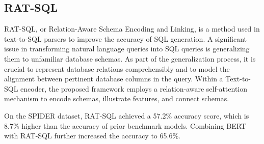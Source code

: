 \subsection{RAT-SQL} \label{sec:ratsql}

RAT-SQL, or Relation-Aware Schema Encoding and Linking\cite{wang_rat-sql_2021}, is a method used in text-to-SQL parsers to improve the accuracy of SQL generation. A significant issue in transforming natural language queries into SQL queries is generalizing them to unfamiliar database schemas. As part of the generalization process, it is crucial to represent database relations comprehensibly and to model the alignment between pertinent database columns in the query. Within a Text-to-SQL encoder, the proposed framework employs a relation-aware self-attention mechanism to encode schemas, illustrate features, and connect schemas.


On the SPIDER dataset, RAT-SQL achieved a 57.2\% accuracy score, which is 8.7\% higher than the accuracy of prior benchmark models. Combining BERT with RAT-SQL further increased the accuracy to 65.6\%.


